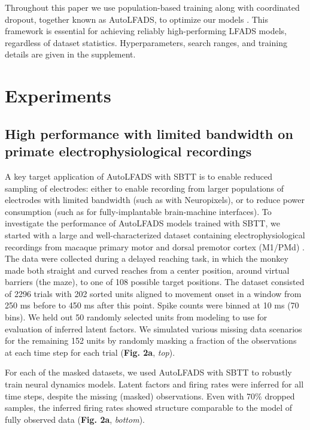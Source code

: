\documentclass{article}
\begin{document}
Throughout this paper we use population-based training along with coordinated dropout, together known as AutoLFADS, to optimize our models  \cite{keshtkaran2019enabling,keshtkaran2021large,jaderberg2017population}. This framework is essential for achieving reliably high-performing LFADS models, regardless of dataset statistics. Hyperparameters, search ranges, and training details are given in the supplement.


\section{Experiments}

\subsection{High performance with limited bandwidth on primate electrophysiological recordings}
\label{section: ephys_sparse}

A key target application of AutoLFADS with SBTT is to enable reduced sampling of electrodes: either to enable recording from larger populations of electrodes with limited bandwidth (such as with Neuropixels), or to reduce power consumption (such as for fully-implantable brain-machine interfaces). To investigate the performance of AutoLFADS models trained with SBTT, we started with a large and well-characterized dataset containing electrophysiological recordings from macaque primary motor and dorsal premotor cortex (M1/PMd) \cite{churchland2010cortical,maze_datarelease}. The data were collected during a delayed reaching task, in which the monkey made both straight and curved reaches from a center position, around virtual barriers (the maze), to one of 108 possible target positions. The dataset consisted of 2296 trials with 202 sorted units aligned to movement onset in a window from 250 ms before to 450 ms after this point. Spike counts were binned at 10 ms (70 bins). We held out 50 randomly selected units from modeling to use for evaluation of inferred latent factors. We simulated various missing data scenarios for the remaining 152 units by randomly masking a fraction of the observations at each time step for each trial (\textbf{Fig. 2a}, \textit{top}).

For each of the masked datasets, we used AutoLFADS with SBTT to robustly train neural dynamics models. Latent factors and firing rates were inferred for all time steps, despite the missing (masked) observations. Even with 70\% dropped samples, the inferred firing rates showed structure comparable to the model of fully observed data (\textbf{Fig. 2a}, \textit{bottom}).
\end{document}
